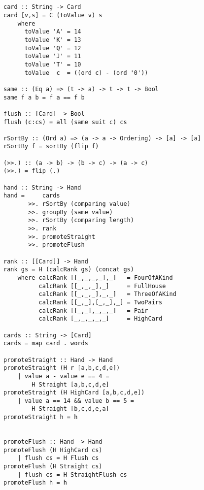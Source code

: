 \lhN \lhA
\begin{lstlisting}[frame=single]


card :: String -> Card
card [v,s] = C (toValue v) s
    where 
      toValue 'A' = 14
      toValue 'K' = 13
      toValue 'Q' = 12
      toValue 'J' = 11
      toValue 'T' = 10
      toValue  c  = ((ord c) - (ord '0'))

same :: (Eq a) => (t -> a) -> t -> t -> Bool
same f a b = f a == f b

flush :: [Card] -> Bool
flush (c:cs) = all (same suit c) cs

rSortBy :: (Ord a) => (a -> a -> Ordering) -> [a] -> [a]
rSortBy f = sortBy (flip f)

(>>.) :: (a -> b) -> (b -> c) -> (a -> c)
(>>.) = flip (.)

hand :: String -> Hand
hand =     cards
       >>. rSortBy (comparing value)
       >>. groupBy (same value)
       >>. rSortBy (comparing length)
       >>. rank
       >>. promoteStraight
       >>. promoteFlush    

rank :: [[Card]] -> Hand
rank gs = H (calcRank gs) (concat gs)  
    where calcRank [[_,_,_,_],_]   = FourOfAKind 
          calcRank [[_,_,_],_]     = FullHouse
          calcRank [[_,_,_],_,_]   = ThreeOfAKind
          calcRank [[_,_],[_,_],_] = TwoPairs
          calcRank [[_,_],_,_,_]   = Pair    
          calcRank [_,_,_,_,_]     = HighCard 

cards :: String -> [Card]
cards = map card . words 

promoteStraight :: Hand -> Hand
promoteStraight (H r [a,b,c,d,e]) 
    | value a - value e == 4 = 
        H Straight [a,b,c,d,e]
promoteStraight (H HighCard [a,b,c,d,e]) 
    | value a == 14 && value b == 5 = 
        H Straight [b,c,d,e,a]
promoteStraight h = h


promoteFlush :: Hand -> Hand
promoteFlush (H HighCard cs) 
    | flush cs = H Flush cs
promoteFlush (H Straight cs) 
    | flush cs = H StraightFlush cs
promoteFlush h = h
\end{lstlisting}
\lhend
